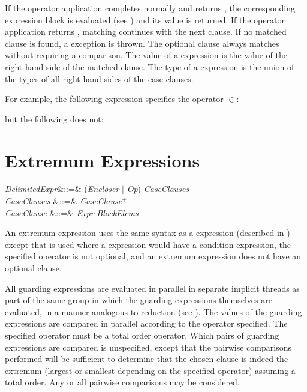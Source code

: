 If the operator application completes normally and returns , the
corresponding expression block is evaluated (see )
and its value is returned.  If the operator application returns ,
matching continues with the next clause.
If no matched clause is found, a  exception is thrown.
The optional  clause always matches without requiring a comparison.
The value of a  expression is the value of the right-hand side
of the matched clause.  The type of a  expression is the
union of the types of all right-hand sides of the case clauses.

For example, the following  expression specifies the operator
$\in$:

but the following does not:




\section{Extremum Expressions}


\begin{Grammar}
\emph{DelimitedExpr}&::=&
  (\emph{Encloser} $|$ \emph{Op}) 
\emph{CaseClauses} \\
\emph{CaseClauses} &::=& \emph{CaseClause}$^+$\\

\emph{CaseClause} &::=& \emph{Expr} \EXP{\Rightarrow} \emph{BlockElems}\\
\end{Grammar}

An extremum expression uses the same syntax as a  expression
(described in ) except that  is used
where a  expression would have a condition expression,
the specified operator is not optional,
and an extremum expression does not have an optional  clause.

All guarding expressions are evaluated in parallel in separate implicit threads
as part of the same group in which the guarding expressions themselves
are evaluated, in a manner analogous to reduction (see ).
The values of the guarding expressions are
compared in parallel according to the operator specified.
The specified operator must be a total order operator.
Which pairs of guarding expressions are
compared is unspecified, except that the pairwise comparisons
performed will be sufficient to determine that the chosen clause is
indeed the extremum (largest or smallest depending on the specified operator)
assuming a total order.  Any or all pairwise comparisons may be considered.


